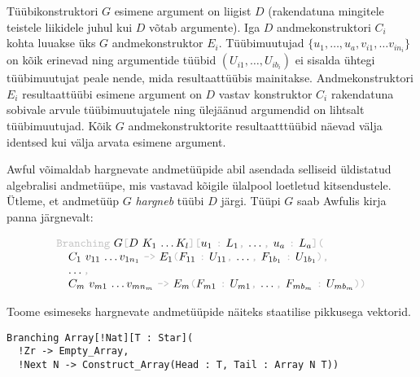 \documentclass[12pt]{article}
\begin{document}
        Tüübikonstruktori $G$ esimene argument on liigist $D$ (rakendatuna mingitele teistele liikidele juhul kui $D$ võtab argumente). Iga $D$ andmekonstruktori $C_i$ kohta luuakse üks $G$ andmekonstruktor $E_i$. Tüübimuutujad $\{u_1,\ldots,u_a,v_{i1},\ldots v_{in_i}\}$ on kõik erinevad ning argumentide tüübid $(U_{i1},\ldots,U_{ib_i})$ ei sisalda ühtegi tüübimuutujat peale nende, mida resultaattüübis mainitakse. Andmekonstruktori $E_i$ resultaattüübi esimene argument on $D$ vastav konstruktor $C_i$ rakendatuna sobivale arvule tüübimuutujatele ning ülejäänud argumendid on lihtsalt tüübimuutujad. Kõik $G$ andmekonstruktorite resultaatttüübid näevad välja identsed kui välja arvata esimene argument.

        Awful võimaldab hargnevate andmetüüpide abil asendada selliseid üldistatud algebralisi andmetüüpe, mis vastavad kõigile ülalpool loetletud kitsendustele. Ütleme, et andmetüüp $G$ \textit{hargneb} tüübi $D$ järgi. Tüüpi $G$ saab Awfulis kirja panna järgnevalt:

        \begin{equation*}
          \begin{tabular}{l}
            {\color{helehall}\verb!Branching!} $G${\color{helehall}\verb![!}$D$ $K_1$ \ldots $K_l${\color{helehall}\verb!][!}$u_1$ {\color{helehall}\verb!:!} $L_1${\color{helehall}\verb!,!} \ldots{\color{helehall}\verb!,!} $u_a$ {\color{helehall}\verb!:!} $L_a${\color{helehall}\verb!](!} \\
            \verb!  !$C_1$ $v_{11}$ \ldots $v_{1n_1}$ {\color{helehall}\verb!->!} $E_1${\color{helehall}\verb!(!}$F_{11}$ {\color{helehall}\verb!:!} $U_{11}${\color{helehall}\verb!,!} \ldots{\color{helehall}\verb!,!} $F_{1b_1}$ {\color{helehall}\verb!:!} $U_{1b_1}${\color{helehall}\verb!),!}\\
            \verb!  !\ldots{\color{helehall}\verb!,!}\\
            \verb!  !$C_m$ $v_{m1}$ \ldots $v_{mn_m}$ {\color{helehall}\verb!->!} $E_m${\color{helehall}\verb!(!}$F_{m1}$ {\color{helehall}\verb!:!} $U_{m1}${\color{helehall}\verb!,!} \ldots{\color{helehall}\verb!,!} $F_{mb_m}$ {\color{helehall}\verb!:!} $U_{mb_m}${\color{helehall}\verb!))!}
          \end{tabular}
        \end{equation*}

        Toome esimeseks hargnevate andmetüüpide näiteks staatilise pikkusega vektorid.

        \begin{verbatim}Branching Array[!Nat][T : Star](
  !Zr -> Empty_Array,
  !Next N -> Construct_Array(Head : T, Tail : Array N T))\end{verbatim}
\end{document}
